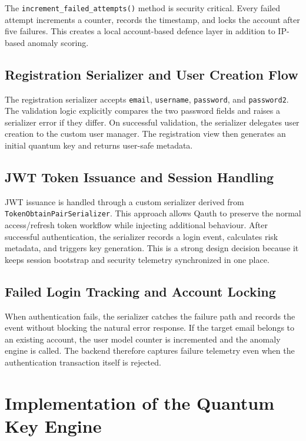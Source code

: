 The \texttt{increment\_failed\_attempts()} method is security critical. Every failed attempt increments a counter, records the timestamp, and locks the account after five failures. This creates a local account-based defence layer in addition to IP-based anomaly scoring.

\subsection{Registration Serializer and User Creation Flow}
The registration serializer accepts \texttt{email}, \texttt{username}, \texttt{password}, and \texttt{password2}. The validation logic explicitly compares the two password fields and raises a serializer error if they differ. On successful validation, the serializer delegates user creation to the custom user manager. The registration view then generates an initial quantum key and returns user-safe metadata.

\subsection{JWT Token Issuance and Session Handling}
JWT issuance is handled through a custom serializer derived from \texttt{TokenObtainPairSerializer}. This approach allows Qauth to preserve the normal access/refresh token workflow while injecting additional behaviour. After successful authentication, the serializer records a login event, calculates risk metadata, and triggers key generation. This is a strong design decision because it keeps session bootstrap and security telemetry synchronized in one place.

\subsection{Failed Login Tracking and Account Locking}
When authentication fails, the serializer catches the failure path and records the event without blocking the natural error response. If the target email belongs to an existing account, the user model counter is incremented and the anomaly engine is called. The backend therefore captures failure telemetry even when the authentication transaction itself is rejected.

\section{Implementation of the Quantum Key Engine}


